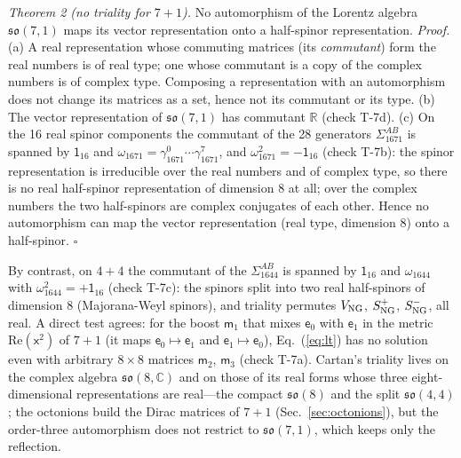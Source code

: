 \emph{Theorem 2 (no triality for $7+1$).} No automorphism of the Lorentz algebra
$\mathfrak{so}(7,1)$ maps its vector representation onto a half-spinor representation.
\emph{Proof.} (a) A real representation whose commuting matrices (its \emph{commutant}) form the
real numbers is of real type; one whose commutant is a copy of the complex numbers is of complex
type. Composing a representation with an automorphism does not change its matrices as a set, hence
not its commutant or its type. (b) The vector representation of $\mathfrak{so}(7,1)$ has commutant
$\mathbb R$ (check T-7d). (c) On the 16 real spinor components the commutant of the 28 generators
$\Sigma^{AB}_{1671}$ is spanned by $\mathsf 1_{16}$ and $\omega_{1671}=\gamma^0_{1671}\cdots
\gamma^7_{1671}$, and $\omega_{1671}^2=-\mathsf 1_{16}$ (check T-7b): the spinor representation is
irreducible over the real numbers and of complex type, so there is no real half-spinor representation
of dimension 8 at all; over the complex numbers the two half-spinors are complex conjugates of each
other. Hence no automorphism can map the vector representation (real type, dimension 8) onto a
half-spinor. $\square$

By contrast, on $4+4$ the commutant of the $\Sigma^{AB}_{1644}$ is spanned by $\mathsf 1_{16}$ and
$\omega_{1644}$ with $\omega_{1644}^2=+\mathsf 1_{16}$ (check T-7c): the spinors split into two real
half-spinors of dimension 8 (Majorana-Weyl spinors), and triality permutes $V_{\rm NG}$, $S^+_{\rm NG}$, $S^-_{\rm NG}$, all real.
A direct test agrees: for the boost $\mathsf m_1$ that mixes $\mathsf e_0$ with $\mathsf e_1$ in the metric
$\mathrm{Re}(\mathsf x^2)$ of $7+1$ (it maps $\mathsf e_0\mapsto\mathsf e_1$ and $\mathsf e_1\mapsto\mathsf e_0$),
Eq.~(\ref{eq:lt}) has no solution even with arbitrary $8\times8$ matrices $\mathsf m_2$, $\mathsf m_3$ (check
T-7a). Cartan's triality lives on the complex algebra $\mathfrak{so}(8,\mathbb C)$ and on those of its real
forms whose three eight-dimensional representations are real---the compact $\mathfrak{so}(8)$ and the split
$\mathfrak{so}(4,4)$; the octonions build the Dirac matrices of $7+1$ (Sec.~\ref{sec:octonions}), but
the order-three automorphism does not restrict to $\mathfrak{so}(7,1)$, which keeps only the reflection.
